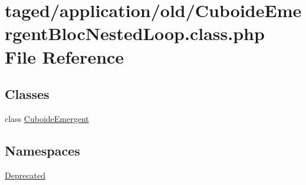 \hypertarget{_cuboide_emergent_bloc_nested_loop_8class_8php}{}\section{taged/application/old/\+Cuboide\+Emergent\+Bloc\+Nested\+Loop.class.\+php File Reference}
\label{_cuboide_emergent_bloc_nested_loop_8class_8php}
\subsection*{Classes}
\begin{DoxyCompactItemize}
\item 
class \hyperlink{class_cuboide_emergent}{Cuboide\+Emergent}
\end{DoxyCompactItemize}
\subsection*{Namespaces}
\begin{DoxyCompactItemize}
\item 
 \hyperlink{namespace_deprecated}{Deprecated}
\end{DoxyCompactItemize}
